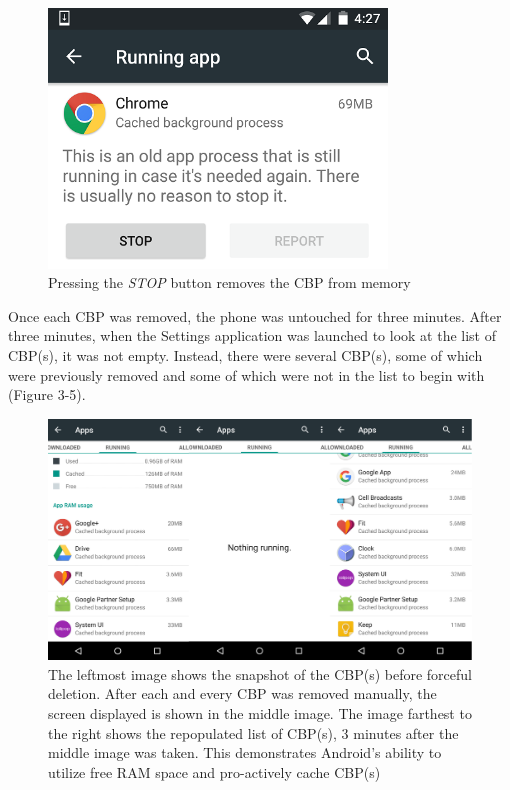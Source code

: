 \documentclass[12pt]{uthesis-v12}  %
\begin{document}
					\begin{figure}[!ht]
						\centering
						\includegraphics[width = 90mm]{images/removeCBP3.png}
						\caption[Remove CBP]
						{Pressing the {\em STOP} button removes the CBP from memory}
					\end{figure}					
					
					Once each CBP was removed, the phone was untouched for three minutes. After three minutes, when the Settings application was launched to look at the list of CBP(s), it was not empty. Instead, there were several CBP(s), some of which were previously removed and some of which were not in the list to begin with (Figure 3-5). 
					
					\begin{figure}[!ht]
						\centering
						\includegraphics[width = 130mm]{images/stage123.png}
						\caption[CBP(s) before and after manual removal]
						{The leftmost image shows the snapshot of the CBP(s) before forceful deletion. After each and every CBP was removed manually, the screen displayed is shown in the middle image. The image farthest to the right shows the repopulated list of CBP(s), 3 minutes after the middle image was taken. This demonstrates Android's ability to utilize free RAM space and pro-actively cache CBP(s)}
					\end{figure}					
					
\end{document}
